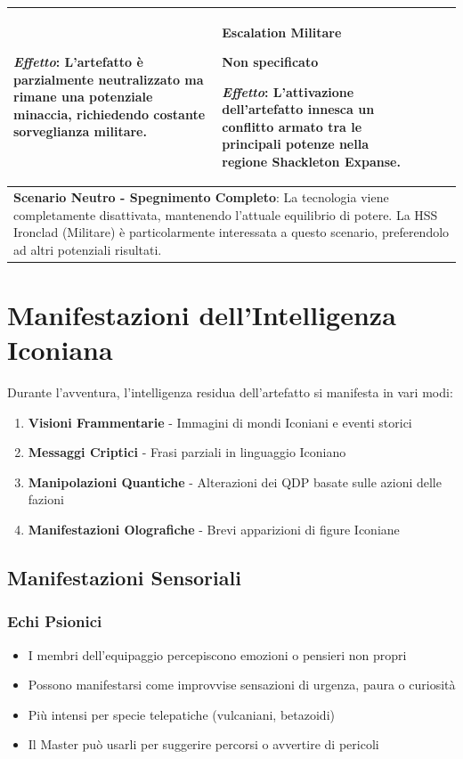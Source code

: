 \documentclass[letterpaper,twocolumn,openany,nodeprecatedcode]{dndbook}
\begin{document}
\begin{landscape}
\begin{table}[htbp]
\begin{tabular}{|p{2.3cm}|p{4cm}|p{4cm}|p{4cm}|p{4cm}|}
\textit{Effetto}: L'artefatto è parzialmente neutralizzato ma rimane una potenziale minaccia, richiedendo costante sorveglianza militare.
& 
\textbf{Escalation Militare}

Non specificato

\textit{Effetto}: L'attivazione dell'artefatto innesca un conflitto armato tra le principali potenze nella regione Shackleton Expanse.
\\ 
\hline
\multicolumn{5}{|p{18.3cm}|}{\textbf{Scenario Neutro - Spegnimento Completo}: La tecnologia viene completamente disattivata, mantenendo l'attuale equilibrio di potere. La HSS Ironclad (Militare) è particolarmente interessata a questo scenario, preferendolo ad altri potenziali risultati.} \\
\hline
\end{tabular}
\end{table}
\end{landscape}
\section{Manifestazioni dell'Intelligenza Iconiana}

Durante l'avventura, l'intelligenza residua dell'artefatto si manifesta in vari modi:

\begin{enumerate}
    \item \textbf{Visioni Frammentarie} - Immagini di mondi Iconiani e eventi storici
    \item \textbf{Messaggi Criptici} - Frasi parziali in linguaggio Iconiano
    \item \textbf{Manipolazioni Quantiche} - Alterazioni dei QDP basate sulle azioni delle fazioni
    \item \textbf{Manifestazioni Olografiche} - Brevi apparizioni di figure Iconiane
\end{enumerate}


\subsection{Manifestazioni Sensoriali}

\subsubsection{Echi Psionici}
   \begin{itemize}
       \item I membri dell'equipaggio percepiscono emozioni o pensieri non propri
       \item Possono manifestarsi come improvvise sensazioni di urgenza, paura o curiosità
       \item Più intensi per specie telepatiche (vulcaniani, betazoidi)
       \item Il Master può usarli per suggerire percorsi o avvertire di pericoli
   \end{itemize}
\end{document}
